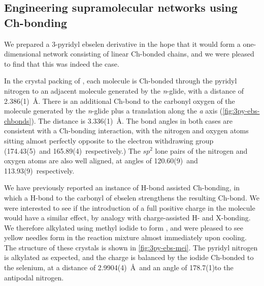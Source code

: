 \begin{refsection}

\chapter{Engineering supramolecular networks using Ch-bonding}

We prepared a 3-pyridyl ebselen derivative  in the hope that it would form a one-dimensional network consisting of linear Ch-bonded chains, and we were pleased to find that this was indeed the case.

In the crystal packing of , each molecule is Ch-bonded through the pyridyl nitrogen to an adjacent molecule generated by the \textit{n}-glide, with a  distance of 2.386(1)~\AA.
There is an additional Ch-bond to the carbonyl oxygen of the molecule generated by the \textit{n}-glide plus a translation along the \textit{a} axis (\cref{fig:3py-ebs-chbonds}).
The  distance is 3.336(1)~\AA.
The bond angles in both cases are consistent with a Ch-bonding interaction, with the nitrogen and oxygen atoms sitting almost perfectly opposite to the electron withdrawing group (174.43(5)\degree~and 165.89(4)\degree~respectively.)
The $sp^2$ lone pairs of the nitrogen and oxygen atoms are also well aligned, at angles of 120.60(9)\degree~and 113.93(9)\degree~respectively.

We have previously reported an instance of H-bond assisted Ch-bonding, in which a H-bond to the carbonyl of ebselen strengthens the resulting Ch-bond.
We were interested to see if the introduction of a full positive charge in the molecule would have a similar effect, by analogy with charge-assisted H- and X-bonding.
We therefore alkylated  using methyl iodide to form , and were pleased to see yellow needles form in the reaction mixture almost immediately upon cooling.
The structure of these crystals is shown in \cref{fig:3py-ebs-mei}.
The pyridyl nitrogen is alkylated as expected, and the charge is balanced by the iodide Ch-bonded to the selenium, at a distance of 2.9904(4)~\AA~and an angle of 178.7(1)\degree to the antipodal nitrogen.


\end{refsection}
